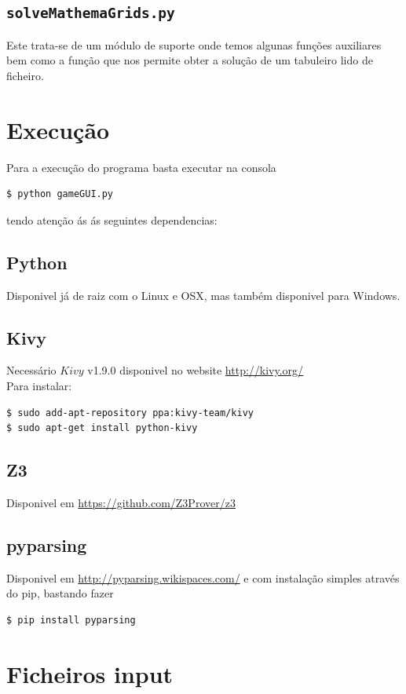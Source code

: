 \documentclass{article}
\begin{document}
\subsection{\texttt{solveMathemaGrids.py}}
Este trata-se de um módulo de suporte onde temos algunas funções auxiliares bem como a função que nos permite obter a solução de um tabuleiro lido de ficheiro.
\newpage
\section{Execução}
Para a execução do programa basta executar na consola 
\begin{verbatim}
$ python gameGUI.py
\end{verbatim}
tendo atenção ás ás seguintes dependencias:
\subsection{Python}
Disponivel já de raiz com o Linux e OSX, mas também disponivel para Windows.
\subsection{Kivy}
Necessário $Kivy$ v1.9.0 disponivel no website {\url{http://kivy.org/}}
\\
Para instalar:
\begin{verbatim}
$ sudo add-apt-repository ppa:kivy-team/kivy
$ sudo apt-get install python-kivy
\end{verbatim}
\subsection{Z3}
Disponivel em {\url{https://github.com/Z3Prover/z3}}
\subsection{pyparsing}
Disponivel em {\url{http://pyparsing.wikispaces.com/}} e com instalação simples através do pip, bastando fazer 

\begin{verbatim}
$ pip install pyparsing
\end{verbatim}

\section{Ficheiros input}

\paragraph{} 
\end{document}
